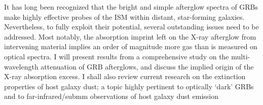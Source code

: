 


\bigskip



\bigskip

\noindent It has long been recognized that the bright and simple afterglow spectra of GRBs make highly effective probes of the ISM within distant, star-forming galaxies. Nevertheless, to fully exploit their potential, several outstanding issues need to be addressed. Most notably, the absorption imprint left on the X-ray afterglow from intervening material implies an order of magnitude more gas than is measured on optical spectra. I will present results from a comprehensive study on the multi-wavelength attenuation of GRB afterglows, and discuss the implied origin of the X-ray absorption excess. I shall also review current research on the extinction properties of host galaxy dust; a topic highly pertinent to optically `dark’ GRBs and to far-infrared/submm observations of host galaxy dust emission


